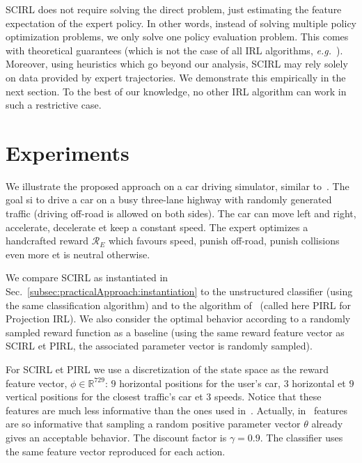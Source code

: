 \documentclass[english,utf8]{./hermes-journal}
\newcommand{\R}{\mathcal{R}}
\begin{document}
SCIRL does not require solving the direct problem, just estimating
the feature expectation of the expert policy. In other words,
instead of solving multiple policy optimization problems, we only
solve one policy evaluation problem. This comes with theoretical
guarantees (which is not the case of all IRL algorithms,
\textit{e.g.}~\cite{boularias:2011}). Moreover, using heuristics
which go beyond our analysis, SCIRL may rely solely on data provided
by expert trajectories. We demonstrate this empirically in the next
section. To the best of our knowledge, no other IRL algorithm can
work in such a restrictive case.


\section{Experiments}
\label{sec:experiments}

We illustrate the proposed approach on a car driving simulator,
similar to~\cite{Abbeel:2004,Syed:2008:game}. The goal si to drive a
car on a busy three-lane highway with randomly generated traffic
(driving off-road is allowed on both sides). The car can move left
and right, accelerate, decelerate et keep a constant speed. The
expert optimizes a handcrafted reward $\R_E$ which favours speed,
punish off-road, punish collisions even more  et is neutral
otherwise.

We compare SCIRL as instantiated in
Sec.~\ref{subsec:practicalApproach:instantiation} to the
unstructured classifier (using the same classification algorithm)
and to the algorithm of~\cite{Abbeel:2004} (called here PIRL for
Projection IRL). We also consider the optimal behavior according to
a randomly sampled reward function as a baseline (using the same
reward feature vector as SCIRL et PIRL, the associated parameter
vector is randomly sampled).

For SCIRL et PIRL we use a discretization of the state space as the
reward feature vector, $\phi\in\mathbb{R}^{729}$: $9$ horizontal
positions for the user's car, $3$ horizontal et $9$ vertical
positions for the closest traffic's car et $3$ speeds. Notice that
these features are much less informative than the ones used
in~\cite{Abbeel:2004,Syed:2008:game}. Actually,
in~\cite{Syed:2008:game} features are so informative that sampling a
random positive parameter vector $\theta$ already gives an
acceptable behavior. The discount factor is $\gamma = 0.9$. The
classifier uses the same feature vector reproduced for each action.
\end{document}
